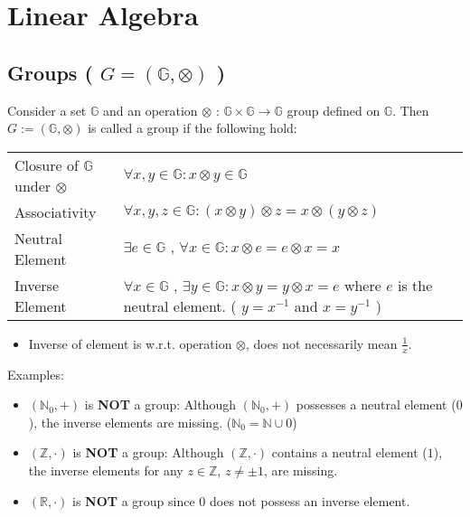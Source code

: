 \chapter{Linear Algebra \cite{mfml-1}}

\section{Groups ( $G = (\mathbb{G}, \otimes)$ ) \cite{mfml-1}}\label{lin-alg-Groups}
Consider a set $\mathbb{G}$ and an operation $\otimes$ : $\mathbb{G} \times \mathbb{G} \rightarrow \mathbb{G}$ group defined on $\mathbb{G}$. Then $G := (\mathbb{G}, \otimes)$ is called a group if the following hold:

\begin{table}[H]
    \begin{tabular}{l p{10cm}}
        Closure of $\mathbb{G}$ under $\otimes$ & $\forall x,y \in \mathbb{G} : x \otimes y \in \mathbb{G}$ \\
        Associativity & $\forall x,y,z \in \mathbb{G}:(x \otimes y) \otimes z = x \otimes (y \otimes z) $ \\
        Neutral Element & $\exists e \in \mathbb{G} \text{ , } \forall x\in \mathbb{G}: x \otimes e = e \otimes x = x$ \\
        Inverse Element & $\forall x\in \mathbb{G} \text{ , } \exists y \in \mathbb{G}: x\otimes y = y\otimes x = e$ where $e$ is the neutral element. ( $y = x^{-1}$ and $x = y^{-1}$ ) \\
    \end{tabular}
\end{table}

\begin{itemize}
    \item Inverse of element is w.r.t. operation $\otimes$, does not necessarily mean $\displaystyle\frac{1}{x}$.
\end{itemize}

Examples:
\begin{itemize}
    \item $(\mathbb{N}_0, +)$ is \textbf{NOT} a group: Although $(\mathbb{N}_0, +)$ possesses a neutral element ($0$), the inverse elements are missing. ($\mathbb{N}_0 = \mathbb{N} \cup {0} $)

    \item $(\mathbb{Z}, \cdot)$ is \textbf{NOT} a group: Although $(\mathbb{Z}, \cdot)$ contains a neutral element ($1$), the inverse elements for any $z \in \mathbb{Z}$, $z \neq \pm 1$, are missing.

    \item $(\mathbb{R}, \cdot)$ is \textbf{NOT} a group since $0$ does not possess an inverse element.

    
\end{itemize}



